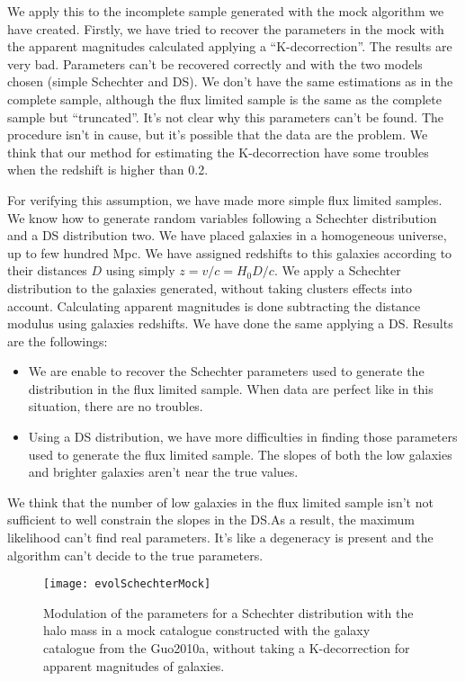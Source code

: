 We apply this to the incomplete sample generated with the mock algorithm we
have created. Firstly, we have tried to recover the parameters in the mock with
the apparent magnitudes calculated applying a ``K-decorrection''. The results
are very bad. Parameters can't be recovered correctly and with the two models
chosen (simple Schechter and DS). We don't have the same estimations as in the
complete sample, although the flux limited sample is the same as the complete
sample but ``truncated''. It's not clear why this parameters can't be found.
The procedure isn't in cause, but it's possible that the data are the problem.
We think that our method for estimating the K-decorrection have some troubles
when the redshift is higher than 0.2.

For verifying this assumption, we have made more simple flux limited samples.
We know how to generate random variables following a Schechter distribution and
a DS distribution two. We have placed galaxies in a homogeneous universe, up to
few hundred Mpc. We have assigned redshifts to this galaxies according to their
distances $D$ using simply $z=v/c={H_0}{D}/c$. We apply a Schechter
distribution to the galaxies generated, without taking clusters effects into
account. Calculating apparent magnitudes is done subtracting the distance
modulus using galaxies redshifts. We have done the same applying a DS.\@
Results are the followings:
%
\begin{itemize}
    \item We are enable to recover the Schechter parameters used to generate
        the distribution in the flux limited sample. When data are perfect like
        in this situation, there are no troubles.
    \item Using a DS distribution, we have more difficulties in finding those
        parameters used to generate the flux limited sample. The slopes of both
        the low galaxies and brighter galaxies aren't near the true values.
\end{itemize}
%
We think that the number of low galaxies in the flux limited sample isn't not
sufficient to well constrain the slopes in the DS.\@ As a result, the maximum
likelihood can't find real parameters. It's like a degeneracy is present and
the algorithm can't decide to the true parameters.
%
\begin{figure}[htb]
    \centering
    \texttt{[image: evolSchechterMock]}
    \caption{Modulation of the parameters for a Schechter distribution with the
    halo mass in a mock catalogue constructed with the galaxy catalogue from
the Guo2010a, without taking a K-decorrection for apparent magnitudes of
galaxies.}
\label{fig:parammock}
\end{figure}

